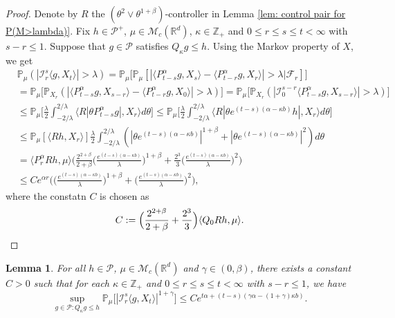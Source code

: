 \documentclass[12pt,a4paper]{amsart}
\theoremstyle{plain}
\newtheorem{lem}[thm]{Lemma}
\theoremstyle{definition}
\numberwithin{equation}{section}
\begin{document}
\begin{proof}
    Denote by $R$ the $(\theta^2\vee\theta^{1+\beta})$-controller in Lemma \ref{lem: control pair for P(M>lambda)}.
    Fix $h \in \mathcal P^+$, $\mu \in \mathcal M_c(\mathbb R^d)$, $\kappa \in \mathbb Z_+ $ and $0\leq r\leq s\leq t < \infty$ with $s-r \leq 1$.
    Suppose that $g\in \mathcal P$ satisfies $Q_\kappa g \leq h$.
    Using the Markov property of $X$, we get
\begin{equation}\begin{split}
    &\mathbb P_{\mu}(|\mathcal I_r^s\langle g, X_t\rangle|>\lambda)
    = \mathbb P_\mu \big[\mathbb P_\mu[|\langle P_{t-s}^\alpha g, X_{s}\rangle - \langle P_{t-r}^\alpha g, X_{r}\rangle|> \lambda\big| \mathscr F_r]\big]
    \\&= \mathbb P_\mu \big[\mathbb P_{X_r}(|\langle P_{t-s}^\alpha g, X_{s-r}\rangle - \langle P_{t-r}^\alpha g, X_{0}\rangle|> \lambda)\big]
    = \mathbb P_\mu \big[\mathbb P_{X_r}(|\mathcal I_0^{s-r}\langle P_{t-s}^\alpha g, X_{s-r}\rangle |> \lambda)\big]
    \\&\leq \mathbb P_\mu \Big[ \frac{\lambda}{2}\int_{-2/\lambda}^{2/\lambda}\langle R|\theta P^\alpha_{t-s}g|,X_r\rangle d\theta \Big]
    \leq \mathbb P_\mu \Big[ \frac{\lambda}{2}\int_{-2/\lambda}^{2/\lambda}\langle R|\theta e^{(t-s)(\alpha- \kappa b)}h|,X_r\rangle d\theta \Big]
    \\&\leq \mathbb P_\mu [ \langle Rh,X_r\rangle ] \frac{\lambda}{2}\int_{-2/\lambda}^{2/\lambda}(|\theta e^{(t-s)(\alpha- \kappa b)}|^{1+\beta} + |\theta e^{(t-s)(\alpha- \kappa b)}|^{2})d\theta
    \\& =  \langle P_r^\alpha Rh,\mu\rangle \bigg(  \frac{2^{2+\beta}}{2+\beta}\Big(\frac{e^{(t-s)(\alpha- \kappa b)}}{\lambda}\Big)^{1+\beta} + \frac{2^{3}}{3}\Big(\frac{e^{(t-s)(\alpha- \kappa b)}}{\lambda}\Big)^2\bigg)
    \\ & \leq C e^{\alpha r} \bigg(\Big( \frac{e^{(t-s)(\alpha - \kappa b)}}{\lambda}\Big)^{1+\beta} + \Big( \frac{e^{(t-s)(\alpha - \kappa b)}}{\lambda}\Big)^{2} \bigg),
\end{split}\end{equation}
    where the constatn $C$ is chosen as
\[
    C := \Big(\frac{2^{2+\beta}}{2+\beta} + \frac{2^{3}}{3} \Big)\langle Q_0Rh, \mu\rangle.
    \qedhere
\]
\end{proof}


\begin{lem}
\label{lem: control of mgtrs}
    For all $h \in \mathcal P$, $\mu \in \mathcal M_c(\mathbb R^d)$ and $\gamma\in (0, \beta)$, there exists a constant $C > 0$ such that for each $\kappa \in \mathbb Z_+$ and $0\leq r\leq s\leq t<\infty$ with $s-r \leq 1$, we have
\[
    \sup_{g \in \mathcal P: Q_\kappa g\leq h} \mathbb P_\mu\big[|\mathcal I_r^s\langle g, X_t\rangle|^{1+\gamma}\big]
    \leq C e^{t\alpha+(t-s) (\gamma\alpha- (1+\gamma)\kappa b)}.
\]
\end{lem}
\end{document}
